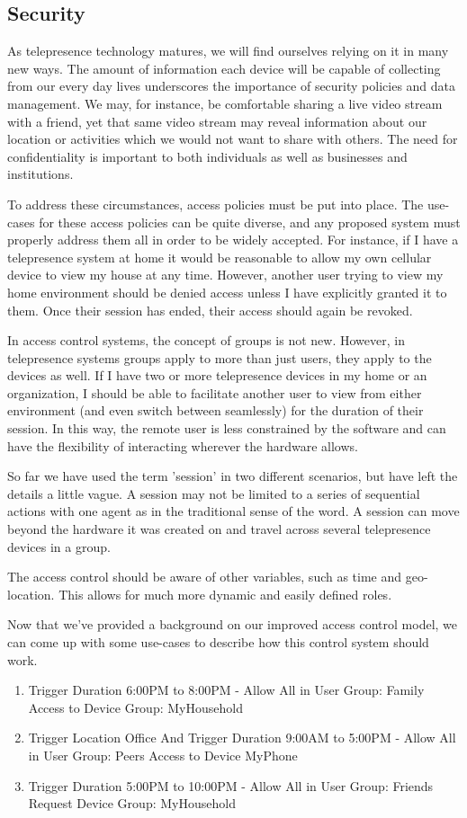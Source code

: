 \documentclass[a4paper,12pt]{report}
\begin{document}
\subsection{Security}

As telepresence technology matures, we will find ourselves relying on it in many new ways. The amount of information each device will be capable of collecting from our every day lives underscores the importance of security policies and data management. We may, for instance, be comfortable sharing a live video stream with a friend, yet that same video stream may reveal information about our location or activities which we would not want to share with others. The need for confidentiality is important to both individuals as well as businesses and institutions.

To address these circumstances, access policies must be put into place. The use-cases for these access policies can be quite diverse, and any proposed system must properly address them all in order to be widely accepted. For instance, if I have a telepresence system at home it would be reasonable to allow my own cellular device to view my house at any time. However, another user trying to view my home environment should be denied access unless I have explicitly granted it to them. Once their session has ended, their access should again be revoked.

In access control systems, the concept of groups is not new. However, in telepresence systems groups apply to more than just users, they apply to the devices as well. If I have two or more telepresence devices in my home or an organization, I should be able to facilitate another user to view from either environment (and even switch between seamlessly) for the duration of their session. In this way, the remote user is less constrained by the software and can have the flexibility of interacting wherever the hardware allows.

So far we have used the term 'session' in two different scenarios, but have left the details a little vague. A session may not be limited to a series of sequential actions with one agent as in the traditional sense of the word. A session can move beyond the hardware it was created on and travel across several telepresence devices in a group.

The access control should be aware of other variables, such as time and geo-location. This allows for much more dynamic and easily defined roles.

Now that we've provided a background on our improved access control model, we can come up with some use-cases to describe how this control system should work.
	\begin{enumerate}
		\item Trigger Duration 6:00PM to 8:00PM - Allow All in User Group: Family Access to Device Group: MyHousehold
		\item Trigger Location Office And Trigger Duration 9:00AM to 5:00PM - Allow All in User Group: Peers Access to Device MyPhone
		\item Trigger Duration 5:00PM to 10:00PM - Allow All in User Group: Friends Request Device Group: MyHousehold
	\end{enumerate}
\end{document}
